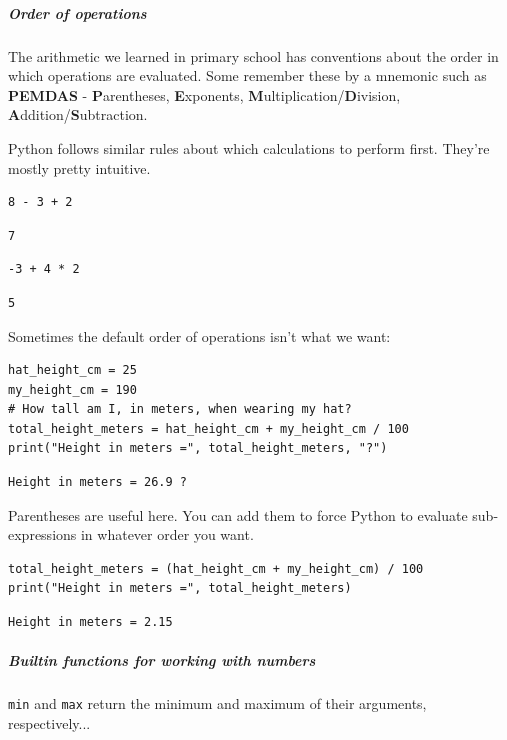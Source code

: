 \subparagraph{Order of operations}

The arithmetic we learned in primary school has conventions about the order in which operations are evaluated. Some remember these by a mnemonic such as \textbf{PEMDAS} - \textbf{P}arentheses, \textbf{E}xponents, \textbf{M}ultiplication/\textbf{D}ivision, \textbf{A}ddition/\textbf{S}ubtraction.

Python follows similar rules about which calculations to perform first. They're mostly pretty intuitive.

\begin{verbatim}
8 - 3 + 2
\end{verbatim}

\begin{verbatim}
7
\end{verbatim}

\begin{verbatim}
-3 + 4 * 2
\end{verbatim}

\begin{verbatim}
5
\end{verbatim}

Sometimes the default order of operations isn't what we want:

\begin{verbatim}
hat_height_cm = 25
my_height_cm = 190
# How tall am I, in meters, when wearing my hat?
total_height_meters = hat_height_cm + my_height_cm / 100
print("Height in meters =", total_height_meters, "?")
\end{verbatim}

\begin{verbatim}
Height in meters = 26.9 ?
\end{verbatim}

Parentheses are useful here. You can add them to force Python to evaluate sub-expressions in whatever order you want.

\begin{verbatim}
total_height_meters = (hat_height_cm + my_height_cm) / 100
print("Height in meters =", total_height_meters)
\end{verbatim}

\begin{verbatim}
Height in meters = 2.15
\end{verbatim}

\subparagraph{Builtin functions for working with numbers}

\texttt{min} and \texttt{max} return the minimum and maximum of their arguments, respectively...

